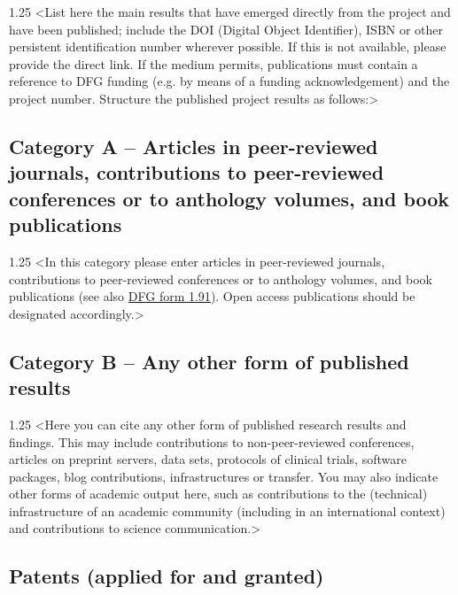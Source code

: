 \documentclass[a4paper, 11pt]{article}
\newenvironment{commentblock}{\begin{spacing}{1.25}\color{CommentColor}}{\end{spacing}\bigskip}
\newcommand{\tg}{\textgreater}
\newcommand{\tl}{\textless}
\begin{document}
\begin{commentblock}
\tl List here the main results that have emerged directly from the project and have been published; include the DOI (Digital Object Identifier), ISBN or other persistent identification number wherever possible. If this is not available, please provide the direct link. If the medium permits, publications must contain a reference to DFG funding (e.g. by means of a funding acknowledgement) and the project number. Structure the published project results as follows:\tg
\end{commentblock}


\subsection{Category A -- Articles in peer-reviewed journals, contributions to peer-reviewed
  conferences or to anthology volumes, and book publications}

\begin{commentblock}
\tl In this category please enter articles in peer-reviewed journals, contributions to peer-reviewed conferences or to anthology volumes, and book publications (see also \href{https://www.dfg.de/formulare/1_91}{DFG form 1.91}). Open access publications should be designated accordingly.\tg
\end{commentblock}


\subsection{Category B – Any other form of published results}

\begin{commentblock}
\tl Here you can cite any other form of published research results and findings. This may include contributions to non-peer-reviewed conferences, articles on preprint servers, data sets, protocols of clinical trials, software packages, blog contributions, infrastructures or transfer. You may also indicate other forms of academic output here, such as contributions to the (technical) infrastructure of an academic community (including in an international context) and contributions to science communication.\tg
\end{commentblock}


\subsection{Patents (applied for and granted)}
\end{document}

